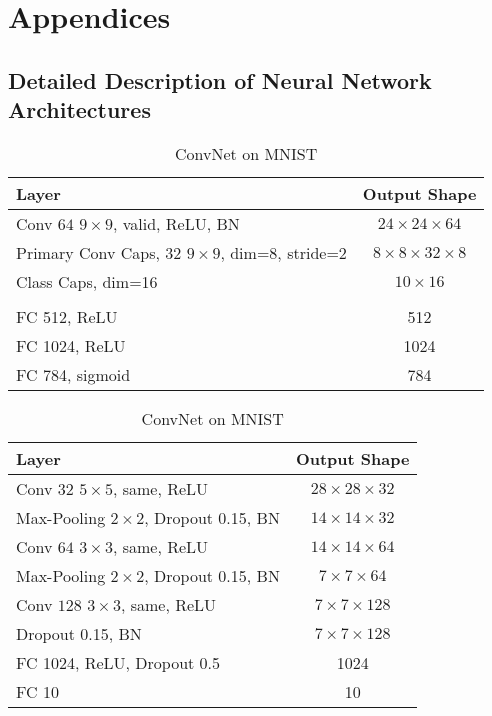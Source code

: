 \appendix
\section*{Appendices}
\renewcommand{\thesubsection}{\Alph{subsection}}

\subsection{Detailed Description of Neural Network Architectures}
\label{lab:networks}

\begin{table}
	
	\centering
	
	\begin{tabular}{lc}
		\toprule 
		Layer	&  Output Shape \\ 
		\midrule 
		Conv $64$ $9\times9$, valid, ReLU, BN & $24\times24\times64$ \\ 
		\midrule 
		Primary Conv Caps, $32$ $9\times9$, dim=$8$, stride=2	&  $8\times8\times32\times8$ \\ 
		\midrule 
		Class Caps, dim=16	& $10\times16$ \\ 
		\midrule 
		& \\
		\midrule
		FC 512, ReLU	& 512 \\
		\midrule
		FC 1024, ReLU	& 1024 \\
		\midrule
		FC 784, sigmoid	& 784 \\
		\bottomrule
	\end{tabular} 
	\caption{CapsNet on MNIST}
	\label{tab:capsnet:mnist}
	
	\vspace{0.75cm}
	
	\begin{tabular}{lc}
		\toprule 
		Layer	&  Output Shape \\ 
		\midrule 
		Conv $32$ $5\times5$, same,	ReLU & $28\times28\times32$ \\ 
		\midrule 
		Max-Pooling $2\times2$, Dropout 0.15, BN	&  $14\times14\times32$ \\ 
		\midrule 
		Conv $64$ $3\times3$, same, ReLU	& $14\times14\times64$ \\ 
		\midrule 
		Max-Pooling $2\times2$, Dropout 0.15, BN	& $7\times7\times64$ \\
		\midrule
		Conv $128$ $3\times3$, same, ReLU	& $7\times7\times128$ \\
		\midrule
		Dropout 0.15, BN	& $7\times7\times128$ \\
		\midrule
		FC 1024, ReLU, Dropout 0.5 & 1024 \\
		\midrule
		FC 10 & 10\\
		\bottomrule
	\end{tabular} 
	\caption{ConvNet on MNIST}
	\label{tab:convnet:mnist}
\end{table}


